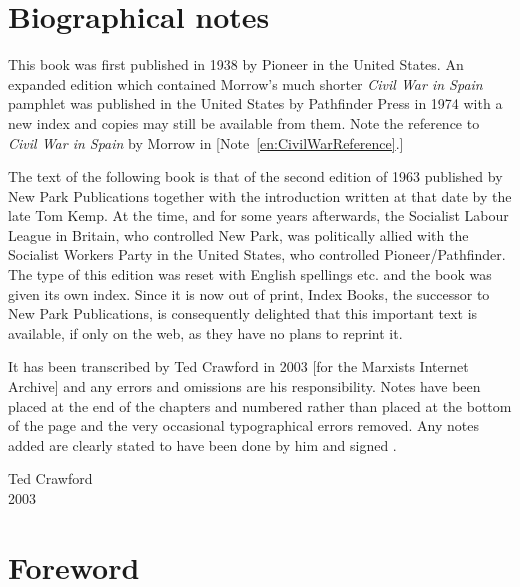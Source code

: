 \chapter{Biographical notes}

This book was first published in 1938 by Pioneer in the United States.
An expanded edition which contained Morrow’s much shorter \emph{Civil War in Spain} pamphlet was published in the United States by Path\-finder Press in 1974 with a new index and copies may still be available from them. Note the reference to \emph{Civil War in Spain} by Morrow in [Note~\ref{en:CivilWarReference}.]

The text of the following book is that of the second edition of 1963 published by New Park Publications together with the introduction written at that date by the late Tom Kemp. At the time, and for some years afterwards, the Socialist Labour League in Britain, who controlled New Park, was politically allied with the Socialist Workers Party in the United States, who controlled Pioneer/Pathfinder. The type of this edition was reset with English spellings etc. and the book was given its own index. Since it is now out of print, Index Books, the successor to New Park Publications, is consequently delighted that this important text is available, if only on the web, as they have no plans to reprint it.

It has been transcribed by Ted Crawford in 2003 [for the Marxists Internet Archive] and any errors and omissions are his responsibility. Notes have been placed at the end of the chapters and numbered rather than placed at the bottom of the page and the very occasional typographical errors removed. Any notes added are clearly stated to have been done by him and signed \ERC.

\begin{flushright}
	Ted Crawford \\
	2003
\end{flushright}

\chapter{Foreword}

